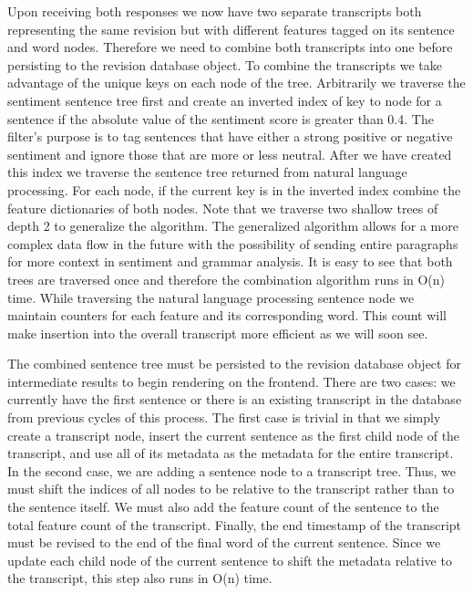 Upon receiving both responses we now have two separate transcripts both
representing the same revision but with different features tagged on its
sentence and word nodes. Therefore we need to combine both transcripts into one
before persisting to the revision database object. To combine the transcripts we
take advantage of the unique keys on each node of the tree. Arbitrarily we
traverse the sentiment sentence tree first and create an inverted index of key
to node for a sentence if the absolute value of the sentiment score is greater
than 0.4. The filter's purpose is to tag sentences that have either a strong
positive or negative sentiment and ignore those that are more or less neutral.
After we have created this index we traverse the sentence tree returned from
natural language processing. For each node, if the current key is in the
inverted index combine the feature dictionaries of both nodes. Note that we
traverse two shallow trees of depth 2 to  generalize the algorithm. The
generalized algorithm allows for a more complex data flow in the future with the
possibility of sending entire paragraphs for more context in sentiment and
grammar analysis. It is easy to see that both trees are traversed once and
therefore the combination algorithm runs in O(n) time. While traversing the
natural language processing sentence node we maintain counters for each feature
and its corresponding word. This count will make insertion into the overall
transcript more efficient as we will soon see.

The combined sentence tree must be persisted to the revision database object for
intermediate results to begin rendering on the frontend. There are two cases: we
currently have the first sentence or there is an existing transcript in the
database from previous cycles of this process. The first case is trivial in that
we simply create a transcript node, insert the current sentence as the first
child node of the transcript, and use all of its metadata as the metadata for
the entire transcript. In the second case, we are adding a sentence node to a
transcript tree. Thus, we must shift the indices of all nodes to be relative to
the transcript rather than to the sentence itself. We must also add the feature
count of the sentence to the total feature count of the transcript. Finally, the
end timestamp of the transcript must be revised to the end of the final word of
the current sentence. Since we update each child node of the current sentence to
shift the metadata relative to the transcript, this step also runs in O(n) time.

